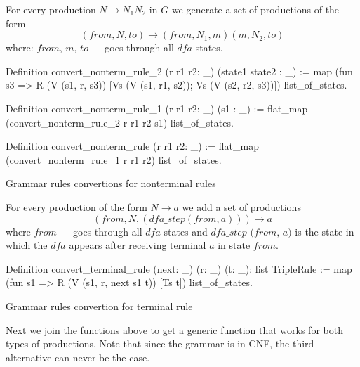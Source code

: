 For every production $N \to N_1 N_2$ in $G$ we generate a set of productions of the form $$(from, N, to) \to (from, N_1,  m) (m, N_2, to)$$ where: $from$, $m$, $to$ --- goes through all $\textit{dfa}$ states.

\begin{listing}[h]
    \begin{pyglist}[language=coq, numbers=none, numbersep=5pt]
  Definition convert_nonterm_rule_2 
    (r r1 r2: _) 
    (state1 state2 : _) :=
    map (fun s3 => R (V (s1, r, s3)) 
                     [Vs (V (s1, r1, s2)); 
                      Vs (V (s2, r2, s3))])
      list_of_states.

  Definition convert_nonterm_rule_1  
               (r r1 r2: _) 
               (s1 : _) :=
    flat_map (convert_nonterm_rule_2 r r1 r2 s1) 
             list_of_states.

  Definition convert_nonterm_rule (r r1 r2: _) :=
    flat_map (convert_nonterm_rule_1 r r1 r2) 
             list_of_states.
    \end{pyglist}
    \caption{Grammar rules convertions for nonterminal rules}
    \label{lst:verbments1}
\end{listing}

For every production of the form $N \to a$ we add a set of productions $$(\textit{from}, N, (\textit{dfa\_step}(\textit{from}, a))) \to a$$ where $\textit{from}$ --- goes through all $\textit{dfa}$ states and $\textit{dfa\_step (from, a)}$ is the state in which the $\textit{dfa}$ appears after receiving terminal $a$ in state $\textit{from}$.

\begin{listing}[h]
    \begin{pyglist}[language=coq, numbers=none, numbersep=5pt]
  Definition convert_terminal_rule 
              (next: _) 
              (r: _) 
              (t: _): list TripleRule :=
    map (fun s1 => R (V (s1, r, next s1 t)) 
	               [Ts t]) 
        list_of_states.
    \end{pyglist}
    \caption{Grammar rules convertion for terminal rule}
    \label{lst:verbments1}
\end{listing}

Next we join the functions above to get a generic function that works for both types of productions. 
Note that since the grammar is in CNF, the third alternative can never be the case.

